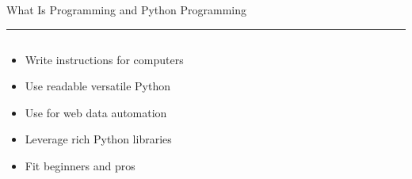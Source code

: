 \documentclass[aspectratio=169]{beamer}
\newcommand{\TitleFont}{\rmfamily}
\begin{document}
\begin{frame}[t]{}
  \vspace*{0.5cm}
  {\TitleFont\fontsize{18}{22}\selectfont\color{LUBronze}What Is Programming and Python Programming\par}
  \vspace{0.3em}
  {\color{LUBronze}\rule{\linewidth}{0.8pt}}\par
  \vspace{0.2cm}
  \begin{columns}[t]
    \begin{column}[t]{0.4\textwidth}
      \vspace*{0pt}
      \begin{itemize}\setlength\itemsep{0.65em}
        \item Write instructions for computers
        \item Use readable versatile Python
        \item Use for web data automation
        \item Leverage rich Python libraries
        \item Fit beginners and pros
      \end{itemize}
    \end{column}
  \end{columns}
\end{frame}
\end{document}
